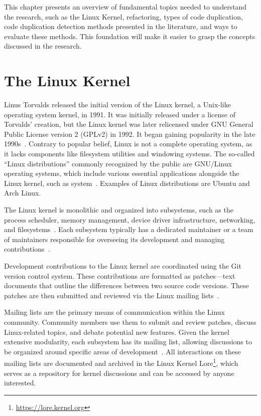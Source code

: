 \en

This chapter presents an overview of fundamental topics needed to understand 
the research, such as the Linux Kernel, refactoring, types of code duplication, 
code duplication detection methods presented in the literature, and ways to 
evaluate these methods. This foundation will make it easier to grasp the 
concepts discussed in the research.

\section{The Linux Kernel}
Linus Torvalds released the initial version of the Linux kernel, a Unix-like operating system kernel, in 1991. It was initially released under a license of Torvalds' creation, but the Linux kernel was later relicensed under GNU General Public License version 2 (GPLv2) in 1992.
%
It began gaining popularity in the late
1990s~\citep{linuxbook}. Contrary to popular belief, Linux is not a
complete operating system, as it lacks components like filesystem utilities and
windowing systems. The so-called ``Linux distributions'' commonly
recognized by the public are GNU/Linux operating systems, which
include various essential applications alongside the Linux kernel,
such as system~\citep{gnuref}. Examples of Linux distributions are Ubuntu 
and Arch Linux.

The Linux kernel is monolithic and organized into subsystems, such as
the process scheduler, memory management, device driver infrastructure,
networking, and filesystems~\citep{melissa}. Each subsystem typically has a
dedicated maintainer or a team of maintainers responsible for overseeing its
development and managing contributions~\citep{melissa}.

Development contributions to the Linux kernel are coordinated using the Git
version control system. These contributions are formatted as patches—text
documents that outline the differences between two source code versions.
These patches are then submitted and reviewed via the Linux mailing lists~\citep{melissa}.

Mailing lists are the primary means of communication within the Linux
community. Community members use them to submit and review patches,
discuss Linux-related topics, and debate potential new features. Given the
kernel extensive modularity, each subsystem has its mailing list, allowing
discussions to be organized around specific areas of development~\citep{melissa}. All interactions on these mailing lists are documented and
archived in the Linux Kernel Lore\footnote{\url{https://lore.kernel.org}}, which serves as a
repository for kernel discussions and can be accessed by anyone interested.

